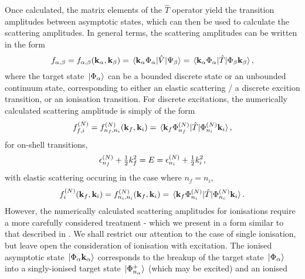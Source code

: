 \documentclass[draft]{article}
\begin{document}
Once calculated, the matrix elements of the $\hat{T}$ operator yield the
transition amplitudes between asymptotic states, which can then be used to
calculate the scattering amplitudes.
In general terms, the scattering amplitudes can be written in the form
\begin{equation}
  \label{eq:scattering-amplitude}
  f_{\alpha, \beta}
  =
  f_{\alpha, \beta}(\vb{k}_{\alpha}, \vb{k}_{\beta})
  =
  \mel*
  {\vb{k}_{\alpha} \Phi_{\alpha}}
  {\hat{V}}
  {\Psi_{\beta}}
  =
  \mel*
  {\vb{k}_{\alpha} \Phi_{\alpha}}
  {\hat{T}}
  {\Phi_{\beta} \vb{k}_{\beta}}
  ,
\end{equation}
where the target state $\ket*{\Phi_{\alpha}}$ can be a bounded discrete
state or an unbounded continuum state, corresponding to either an elastic
scattering / a discrete excition transition, or an ionisation transition.
For discrete excitations, the numerically calculated scattering amplitude is
simply of the form
\begin{equation}
  \label{eq:scattering-amplitude-discrete}
  f_{f, i}^{(N)}
  =
  f_{n_{f}, n_{i}}^{(N)}(\vb{k}_{f}, \vb{k}_{i})
  =
  \mel*
  {\vb{k}_{f} \Phi_{n_{f}}^{(N)}}
  {\hat{T}}
  {\Phi_{n_{i}}^{(N)} \vb{k}_{i}}
  ,
\end{equation}
for on-shell transitions,
\begin{equation}
  \label{eq:on-shell-energy-discrete}
  \epsilon_{n_{f}}^{(N)}
  +
  \tfrac{1}{2}
  k_{f}^{2}
  =
  E
  =
  \epsilon_{n_{i}}^{(N)}
  +
  \tfrac{1}{2}
  k_{i}^{2}
  ,
\end{equation}
with elastic scattering occuring in the case where $n_{f} = n_{i}$,
\begin{equation}
  \label{eq:scattering-amplitude-elastic}
  f_{i}^{(N)}(\vb{k}_{f}, \vb{k}_{i})
  =
  f_{n_{i}, n_{i}}^{(N)}(\vb{k}_{f}, \vb{k}_{i})
  =
  \mel*
  {\vb{k}_{f} \Phi_{n_{i}}^{(N)}}
  {\hat{T}}
  {\Phi_{n_{i}}^{(N)} \vb{k}_{i}}
  .
\end{equation}
However, the numerically calculated scattering amplitudes for ionisations
require a more carefully considered treatment - which we present in a form
similar to that described in \cite{PhysRevLett.89.273201, PhysRevA.90.022710}.
We shall restrict our attention to the case of single ionisation, but leave open
the consideration of ionisation with excitation.
The ionised asymptotic state $\ket*{\Phi_{\alpha} \vb{k}_{\alpha}}$ corresponds
to the breakup of the target state $\ket*{\Phi_{\alpha}}$ into a singly-ionised
target state $\ket*{\Phi_{n_{\alpha}}^{+}}$ (which may be excited) and an ionised
\end{document}
